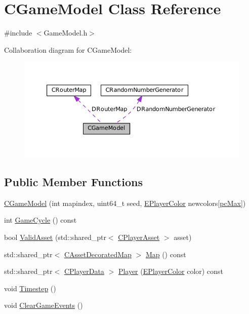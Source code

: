 \hypertarget{classCGameModel}{}\section{C\+Game\+Model Class Reference}
\label{classCGameModel}


{\ttfamily \#include $<$Game\+Model.\+h$>$}



Collaboration diagram for C\+Game\+Model\+:\nopagebreak
\begin{figure}[H]
\begin{center}
\leavevmode
\includegraphics[width=350pt]{classCGameModel__coll__graph}
\end{center}
\end{figure}
\subsection*{Public Member Functions}
\begin{DoxyCompactItemize}
\item 
\hyperlink{classCGameModel_a37858821d1294b21b374cf4f81052f3e}{C\+Game\+Model} (int mapindex, uint64\+\_\+t seed, \hyperlink{GameDataTypes_8h_aafb0ca75933357ff28a6d7efbdd7602f}{E\+Player\+Color} newcolors\mbox{[}\hyperlink{GameDataTypes_8h_aafb0ca75933357ff28a6d7efbdd7602fa594a5c8dd3987f24e8a0f23f1a72cd34}{pc\+Max}\mbox{]})
\item 
int \hyperlink{classCGameModel_af27947dce7cc0fa2dc9ec81872e26264}{Game\+Cycle} () const
\item 
bool \hyperlink{classCGameModel_a5e6e46dd32a655e2a4432aeb134cc7e3}{Valid\+Asset} (std\+::shared\+\_\+ptr$<$ \hyperlink{classCPlayerAsset}{C\+Player\+Asset} $>$ asset)
\item 
std\+::shared\+\_\+ptr$<$ \hyperlink{classCAssetDecoratedMap}{C\+Asset\+Decorated\+Map} $>$ \hyperlink{classCGameModel_a7b95d8fb5d96d3dd9ad3596e1a90f6a3}{Map} () const
\item 
std\+::shared\+\_\+ptr$<$ \hyperlink{classCPlayerData}{C\+Player\+Data} $>$ \hyperlink{classCGameModel_ad9c8def41d5369661fab971b9a4fe786}{Player} (\hyperlink{GameDataTypes_8h_aafb0ca75933357ff28a6d7efbdd7602f}{E\+Player\+Color} color) const
\item 
void \hyperlink{classCGameModel_a699325d41d7ff27bda47bfb3048cfd8f}{Timestep} ()
\item 
void \hyperlink{classCGameModel_a7591a4e79f91a048462bce532fd4eca1}{Clear\+Game\+Events} ()
\end{DoxyCompactItemize}
